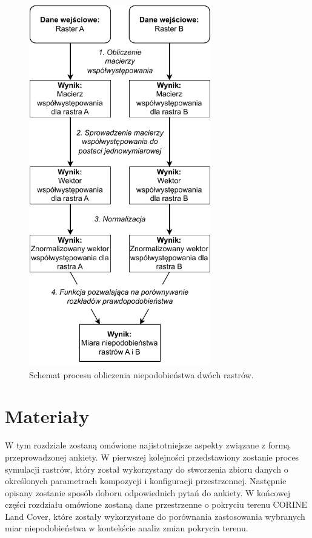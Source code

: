 \documentclass{amuthesis}
\begin{document}
\begin{figure}[t]

{\centering \includegraphics[width=3.125in,height=6.25in]{figures/diagram_raster_comparison.pdf}

}

\caption{\label{fig-schemat-porownanie}Schemat procesu obliczenia
niepodobieństwa dwóch rastrów.}

\end{figure}


\hypertarget{sec-materialy}{%
\chapter{Materiały}\label{sec-materialy}}

W tym rozdziale zostaną omówione najistotniejsze aspekty związane z
formą przeprowadzonej ankiety. W pierwszej kolejności przedstawiony
zostanie proces symulacji rastrów, który został wykorzystany do
stworzenia zbioru danych o określonych parametrach kompozycji i
konfiguracji przestrzennej. Następnie opisany zostanie sposób doboru
odpowiednich pytań do ankiety. W końcowej części rozdziału omówione
zostaną dane przestrzenne o pokryciu terenu CORINE Land Cover, które
zostały wykorzystane do porównania zastosowania wybranych miar
niepodobieństwa w kontekście analiz zmian pokrycia terenu.
\end{document}
